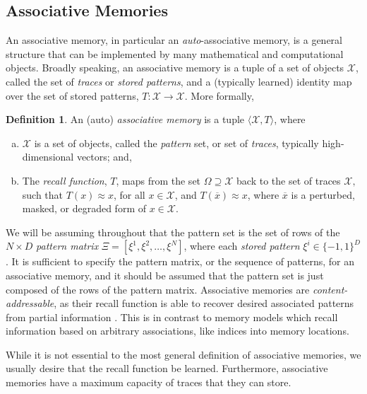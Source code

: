 \documentclass{article}
\theoremstyle{definition}
\newtheorem{definition}{Definition}[subsection]
\begin{document}
\subsection{Associative Memories}\label{sec:associative-memories}

An associative memory, in particular an \textit{auto}-associative memory,
is a general structure that can be implemented by many mathematical
and computational objects. Broadly speaking, an associative memory is a
tuple of a set of objects $\mathcal X$, called the set of
\textit{traces} or \textit{stored patterns},
and a (typically learned) identity map over the set of stored
patterns, $T: \mathcal X \to \mathcal X$.
More formally,

\begin{definition}
  An (auto) \textit{associative memory} is a tuple $\langle \mathcal
  X, T \rangle$, where
  \begin{enumerate}[(a)]
    \item $\mathcal X$ is a set of objects, called the
      \textit{pattern} set, or set of \textit{traces}, typically
      high-dimensional vectors; and,
    \item The \textit{recall function}, $T$, maps from the set
      $\Omega \supseteq \mathcal{X}$ back to
      the set of traces $\mathcal{X},$ such that $T(x) \approx x$,
      for all $x \in
      \mathcal{X}$,
      and $T(\overline x) \approx x$, where $\overline x$ is a
      perturbed, masked, or degraded form of $x \in \mathcal{X}$.
  \end{enumerate}
\end{definition}

We will be assuming throughout that the pattern set is the set of rows
of the $N \times D$ \textit{pattern matrix} $\Xi = [\xi^1, \xi^2,
\dots, \xi^N]$,
where each \textit{stored pattern} $\xi^i \in \{-1, 1\}^D$. It is sufficient
to specify the pattern matrix, or the sequence of patterns, for an
associative memory,
and it should be assumed that the pattern set is just composed of the
rows of the pattern matrix.
Associative memories are \textit{content-addressable}, as their recall function
is able to recover desired associated patterns from partial information
\parencites{mcclelland_appeal_1986,haykin_neural_2009}. This is in
contrast to memory models which recall information based on arbitrary
associations, like indices into memory locations.

While it is not essential to the most general definition of
associative memories,
we usually desire that the recall function be learned. Furthermore,
associative memories have a maximum capacity of traces that they can store.
\end{document}
